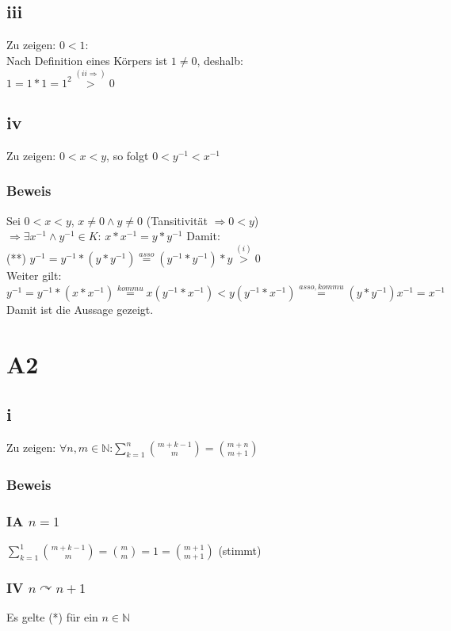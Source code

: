 \documentclass[11pt]{scrartcl}
\begin{document}
\subsection{iii}
Zu zeigen: $0 < 1 $: \\
Nach Definition eines Körpers ist $1 \neq 0$, deshalb: \\
$1 = 1*1 = 1^2  \overset{(ii \Rightarrow)}{>} 0$

\subsection{iv}
Zu zeigen: $0 < x < y$, so folgt $0 < y^{-1} < x^{-1}$
\subsubsection*{Beweis}
Sei $0 < x < y$, $x \neq 0 \land y \neq 0$ (Tansitivität $\Rightarrow 0 < y$) \\
$\Rightarrow \exists x^{-1} \land y^{-1} \in K$: $x*x^{-1} = y*y^{-1}$ Damit: \\
(**) $y^{-1} = y^{-1} * (y*y^{-1}) \overset{asso}{=} (y^{-1}*y^{-1})*y \overset{(i)}{>} 0 $ \\
Weiter gilt: \\
 $y^{-1} = y^{-1} * (x*x^{-1}) \overset{kommu}{=} x(y^{-1}*x^{-1}) < y(y^{-1}*x^{-1}) \overset{asso,kommu}{=} (y*y^{-1})x^{-1} = x^{-1}$ \\
Damit ist die Aussage gezeigt.

\section{A2}
\subsection{i}
Zu zeigen: $\forall n,m \in \mathbb{N}$:$\sum\limits_{k=1}^{n} {m+k-1 \choose m} = {m+n \choose m+1}$ 
\subsubsection*{Beweis}
\subsubsection*{IA $n=1$}
$\sum\limits_{k=1}^1 {m+k-1 \choose m} = {m \choose m} = 1 = {m +1 \choose m+1}$ (stimmt) \\
\subsubsection*{IV $n \curvearrowright n+1$}
Es gelte (*) für ein $n \in \mathbb{N}$
\end{document}
